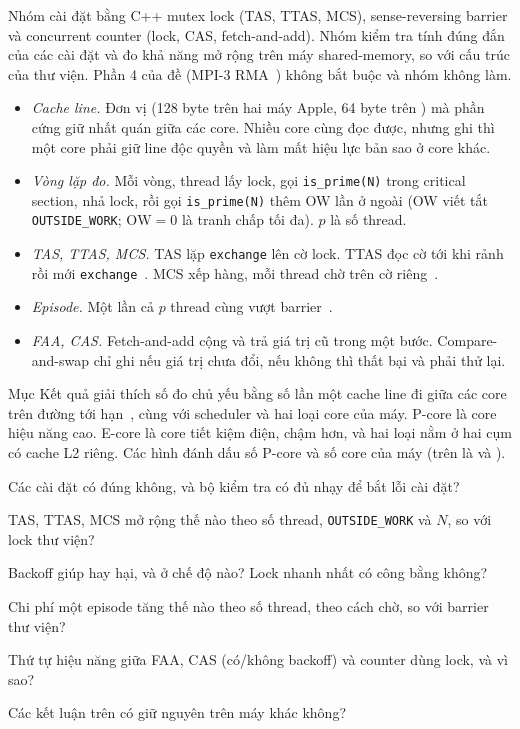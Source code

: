 Nhóm cài đặt bằng C++ mutex lock (TAS, TTAS, MCS), sense-reversing barrier và concurrent counter
(lock, CAS, fetch-and-add). Nhóm kiểm tra tính đúng đắn của các cài đặt và đo khả năng mở rộng trên máy
shared-memory, so với cấu trúc của thư viện. Phần 4 của đề (MPI-3 RMA~\cite{mpi41}) không bắt buộc và nhóm không làm.

\begin{itemize}[nosep]
  \item \emph{Cache line.} Đơn vị (128 byte trên hai máy Apple, 64 byte trên )
    mà phần cứng giữ nhất quán giữa các core. Nhiều core cùng đọc được, nhưng ghi thì một core phải giữ
    line độc quyền và làm mất hiệu lực bản sao ở core khác.
  \item \emph{Vòng lặp đo.} Mỗi vòng, thread lấy lock, gọi \texttt{is\_prime(N)} trong critical
    section, nhả lock, rồi gọi \texttt{is\_prime(N)} thêm OW lần ở ngoài (OW viết tắt
    \texttt{OUTSIDE\_WORK}; $\mathrm{OW} = 0$ là tranh chấp tối đa). $p$ là số thread.
  \item \emph{TAS, TTAS, MCS.} TAS lặp \texttt{exchange} lên cờ lock. TTAS đọc cờ tới khi rảnh rồi mới
    \texttt{exchange}~\cite{anderson1990spinlock}. MCS xếp hàng, mỗi thread chờ trên cờ
    riêng~\cite{mellorcrummey1991mcs}.
  \item \emph{Episode.} Một lần cả $p$ thread cùng vượt barrier~\cite{hensgen1988barrier}.
  \item \emph{FAA, CAS.} Fetch-and-add cộng và trả giá trị cũ trong một bước. Compare-and-swap chỉ ghi
    nếu giá trị chưa đổi, nếu không thì thất bại và phải thử lại.
\end{itemize}

Mục Kết quả giải thích số đo chủ yếu bằng số lần một cache line đi giữa các core trên đường tới
hạn~\cite{herlihy2020art}, cùng với scheduler và hai loại core của máy. P-core là core hiệu năng cao.
E-core là core tiết kiệm điện, chậm hơn, và hai loại nằm ở hai cụm có cache L2 riêng. Các hình đánh dấu
số P-core và số core của máy (trên  là  và
).

\begin{description}[leftmargin=0pt, itemsep=0.2em, font=\normalfont]
  \item[RQ1 (đúng đắn).] Các cài đặt có đúng không, và bộ kiểm tra có đủ nhạy để bắt lỗi cài đặt?
  \item[RQ2 (lock: mở rộng).] TAS, TTAS, MCS mở rộng thế nào theo số thread, \texttt{OUTSIDE\_WORK} và
    $N$, so với lock thư viện?
  \item[RQ3 (lock: backoff và công bằng).] Backoff giúp hay hại, và ở chế độ nào? Lock nhanh nhất có
    công bằng không?
  \item[RQ4 (barrier).] Chi phí một episode tăng thế nào theo số thread, theo cách chờ, so với barrier
    thư viện?
  \item[RQ5 (counter).] Thứ tự hiệu năng giữa FAA, CAS (có/không backoff) và counter dùng lock, và vì
    sao?
  \item[RQ6 (giữa các máy).] Các kết luận trên có giữ nguyên trên máy khác không?
\end{description}

